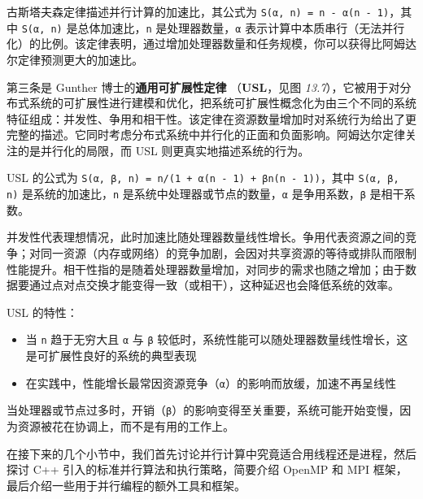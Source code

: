 \label{idx:1234}
古斯塔夫森定律描述并行计算的加速比，其公式为 \texttt{S(\allowbreak{}α,\allowbreak{} n)\allowbreak{} =\allowbreak{} n }\texttt{- α(\allowbreak{}n - 1)\allowbreak{}}，其中 \texttt{S(α, n)} 是总体加速比，\texttt{n} 是处理器数量，\texttt{α} 表示计算中本质串行（无法并行化）的比例。该定律表明，通过增加处理器数量和任务规模，你可以获得比阿姆达尔定律预测更大的加速比。

\label{idx:1235}
第三条是 Gunther 博士的\textbf{通用可扩展性定律 }（\textbf{USL}，见图 \emph{13.7}），它被用于对分布式系统的可扩展性进行建模和优化，把系统可扩展性概念化为由三个不同的系统特征组成：并发性、争用和相干性。该定律在资源数量增加时对系统行为给出了更完整的描述。它同时考虑分布式系统中并行化的正面和负面影响。阿姆达尔定律关注的是并行化的局限，而 USL 则更真实地描述系统的行为。

USL 的公式为 \texttt{S(\allowbreak{}α,\allowbreak{} β,\allowbreak{} n)\allowbreak{} =\allowbreak{} n/\allowbreak{}(\allowbreak{}1 +\allowbreak{} α(\allowbreak{}n - 1)\allowbreak{} +\allowbreak{} βn(\allowbreak{}n - 1)\allowbreak{})\allowbreak{}}，其中 \texttt{S(\allowbreak{}α,\allowbreak{} β,\allowbreak{} n)\allowbreak{}} 是系统的加速比，\texttt{n} 是系统中处理器或节点的数量，\texttt{α} 是争用系数，\texttt{β} 是相干系数。

并发性代表理想情况，此时加速比随处理器数量线性增长。争用代表资源之间的竞争；对同一资源（内存或网络）的竞争加剧，会因对共享资源的等待或排队而限制性能提升。相干性指的是随着处理器数量增加，对同步的需求也随之增加；由于数据要通过点对点交换才能变得一致（或相干），这种延迟也会降低系统的效率。


USL 的特性：

\begin{itemize}
\label{idx:1236}
\item 当 \texttt{n} 趋于无穷大且 \texttt{α} 与 \texttt{β} 较低时，系统性能可以随处理器数量线性增长，这是可扩展性良好的系统的典型表现
\item 在实践中，性能增长最常因资源竞争（\texttt{α}）的影响而放缓，加速不再呈线性
\end{itemize}

当处理器或节点过多时，开销（\texttt{β}）的影响变得至关重要，系统可能开始变慢，因为资源被花在协调上，而不是有用的工作上。

在接下来的几个小节中，我们首先讨论并行计算中究竟适合用线程还是进程，然后探讨 C++ 引入的标准并行算法和执行策略，简要介绍 OpenMP 和 MPI 框架，最后介绍一些用于并行编程的额外工具和框架。

